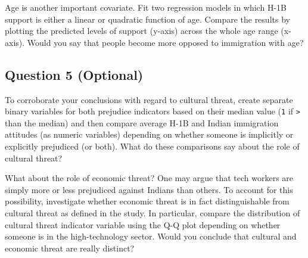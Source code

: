 \documentclass[]{article}
\begin{document}
Age is another important covariate. Fit two regression models in which
H-1B support is either a linear or quadratic function of age. Compare
the results by plotting the predicted levels of support (y-axis) across
the whole age range (x-axis). Would you say that people become more
opposed to immigration with age?

\subsection{Question 5 (Optional)}\label{question-5-optional}

To corroborate your conclusions with regard to cultural threat, create
separate binary variables for both prejudice indicators based on their
median value (\texttt{1} if \texttt{\textgreater{}} than the median) and
then compare average H-1B and Indian immigration attitudes (as numeric
variables) depending on whether someone is implicitly or explicitly
prejudiced (or both). What do these comparisons say about the role of
cultural threat?

What about the role of economic threat? One may argue that tech workers
are simply more or less prejudiced against Indians than others. To
account for this possibility, investigate whether economic threat is in
fact distinguishable from cultural threat as defined in the study. In
particular, compare the distribution of cultural threat indicator
variable using the Q-Q plot depending on whether someone is in the
high-technology sector. Would you conclude that cultural and economic
threat are really distinct?
\end{document}
